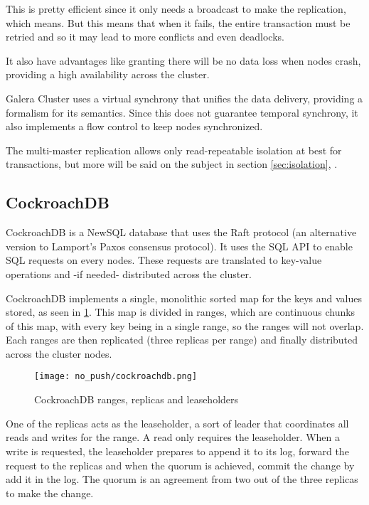 This is pretty efficient since it only needs a broadcast to make the replication, which means. But this means that when it fails, the entire transaction must be retried and so it may lead to more conflicts and even deadlocks.

It also have advantages like granting there will be no data loss when nodes crash, providing a high availability across the cluster.

Galera Cluster uses a virtual synchrony that unifies the data delivery, providing a formalism for its semantics. Since this does not guarantee temporal synchrony, it also implements a flow control to keep nodes synchronized.

The multi-master replication allows only read-repeatable isolation at best for transactions, but more will be said on the subject in section \ref{sec:isolation}, \pageref{sec:isolation}.


\subsection{CockroachDB}
CockroachDB is a NewSQL database that uses the Raft protocol (an alternative version to Lamport's Paxos consensus protocol).
It uses the SQL API to enable SQL requests on every nodes. These requests are translated to key-value operations and -if needed- distributed across the cluster.

CockroachDB implements a single, monolithic sorted map for the keys and values stored, as seen in \ref{fig:cockroachdb}. This map is divided in ranges, which are continuous chunks of this map, with every key being in a single range, so the ranges will not overlap. Each ranges are then replicated (three replicas per range) and finally distributed across the cluster nodes.\cite{CRDB:automatedoperations}

\begin{figure}[H]
  \vspace{-10pt}
  \centering
  \centerline{\texttt{[image: no\_push/cockroachdb.png]}}
  \vspace{-5pt}
  \caption{CockroachDB ranges, replicas and leaseholders}
  \vspace{-5pt}
  \label{fig:cockroachdb}
\end{figure}

One of the replicas acts as the leaseholder, a sort of leader that coordinates all reads and writes for the range. A read only requires the leaseholder.
When a write is requested, the leaseholder prepares to append it to its log, forward the request to the replicas and when the quorum is achieved, commit the change by add it in the log. The quorum is an agreement from two out of the three replicas to make the change.

